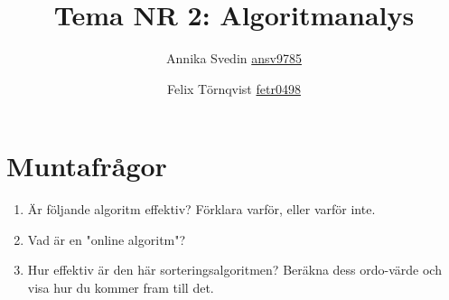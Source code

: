 \documentclass[a5paper,10pt,oneside]{article}
\title{Tema NR 2: Algoritmanalys}
\author{Annika Svedin \url{ansv9785} \and Felix Törnqvist \url{fetr0498}}
\begin{document}
\maketitle

\section*{Muntafrågor}

\begin{enumerate}

\item Är följande algoritm effektiv? Förklara varför, eller varför inte. 



\item Vad är en "online algoritm"?
\item Hur effektiv är den här sorteringsalgoritmen? Beräkna dess ordo-värde och visa hur du kommer fram till det.









\end{enumerate}
\end{document}
